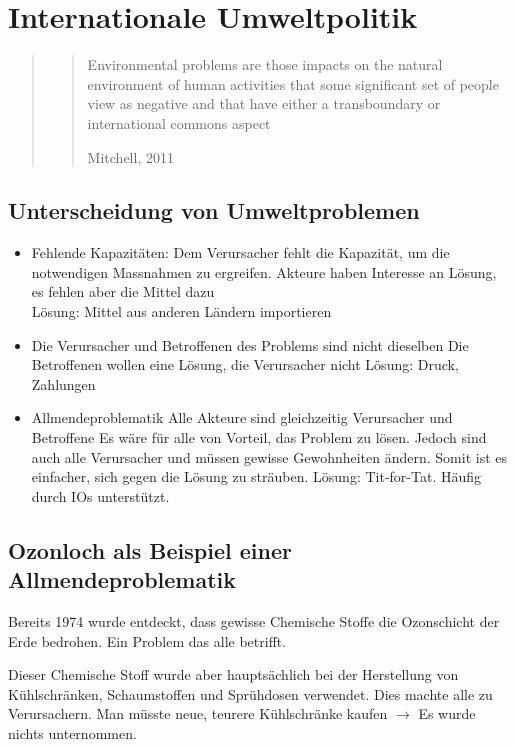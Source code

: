 \documentclass[a4paper, 11pt]{article}
\begin{document}
\section{Internationale Umweltpolitik}

\begin{quote}
    \centering
    \blockquote[Mitchell, 2011]{Environmental problems are those impacts on the natural environment of human activities that some significant set of people view as negative and that have either a transboundary or international commons aspect}
\end{quote}

\subsection{Unterscheidung von Umweltproblemen}
\begin{itemize}
    \item Fehlende Kapazitäten:
        \subitem Dem Verursacher fehlt die Kapazität, um die notwendigen Massnahmen zu ergreifen.
        \subitem Akteure haben Interesse an Lösung, es fehlen aber die Mittel dazu \\
        \subitem Lösung: Mittel aus anderen Ländern importieren
    \item Die Verursacher und Betroffenen des Problems sind nicht dieselben
        \subitem Die Betroffenen wollen eine Lösung, die Verursacher nicht
        \subitem Lösung: Druck, Zahlungen
    \item Allmendeproblematik
        \subitem Alle Akteure sind gleichzeitig Verursacher und Betroffene
        \subitem Es wäre für alle von Vorteil, das Problem zu lösen. Jedoch sind auch alle Verursacher und müssen gewisse Gewohnheiten ändern. Somit ist es einfacher, sich gegen die Lösung zu sträuben.
        \subitem Lösung: Tit-for-Tat. Häufig durch IOs unterstützt.
\end{itemize}

\subsection{Ozonloch als Beispiel einer Allmendeproblematik}
Bereits 1974 wurde entdeckt, dass gewisse Chemische Stoffe die Ozonschicht der Erde bedrohen. Ein Problem das alle betrifft. 

Dieser Chemische Stoff wurde aber hauptsächlich bei der Herstellung von Kühlschränken, Schaumstoffen und Sprühdosen verwendet. Dies machte alle zu Verursachern. Man müsste neue, teurere Kühlschränke kaufen $\rightarrow$ Es wurde nichts unternommen.
\end{document}
